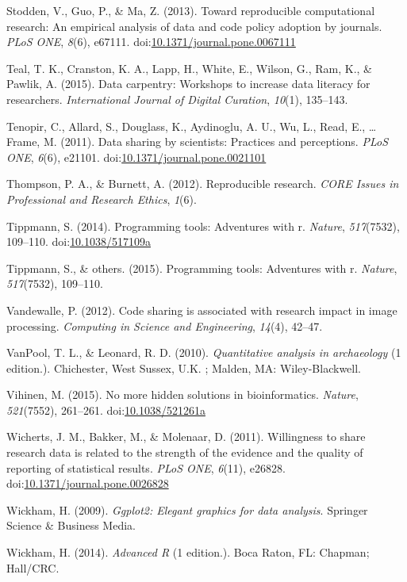 \documentclass[american,man]{apa6}
\begin{document}
Stodden, V., Guo, P., \& Ma, Z. (2013). Toward reproducible
computational research: An empirical analysis of data and code policy
adoption by journals. \emph{PLoS ONE}, \emph{8}(6), e67111.
doi:\href{http://dx.doi.org/10.1371/journal.pone.0067111}{10.1371/journal.pone.0067111}

Teal, T. K., Cranston, K. A., Lapp, H., White, E., Wilson, G., Ram, K.,
\& Pawlik, A. (2015). Data carpentry: Workshops to increase data
literacy for researchers. \emph{International Journal of Digital
Curation}, \emph{10}(1), 135--143.

Tenopir, C., Allard, S., Douglass, K., Aydinoglu, A. U., Wu, L., Read,
E., \ldots{} Frame, M. (2011). Data sharing by scientists: Practices and
perceptions. \emph{PLoS ONE}, \emph{6}(6), e21101.
doi:\href{http://dx.doi.org/10.1371/journal.pone.0021101}{10.1371/journal.pone.0021101}

Thompson, P. A., \& Burnett, A. (2012). Reproducible research.
\emph{CORE Issues in Professional and Research Ethics}, \emph{1}(6).

Tippmann, S. (2014). Programming tools: Adventures with r.
\emph{Nature}, \emph{517}(7532), 109--110.
doi:\href{http://dx.doi.org/10.1038/517109a}{10.1038/517109a}

Tippmann, S., \& others. (2015). Programming tools: Adventures with r.
\emph{Nature}, \emph{517}(7532), 109--110.

Vandewalle, P. (2012). Code sharing is associated with research impact
in image processing. \emph{Computing in Science and Engineering},
\emph{14}(4), 42--47.

{VanPool}, T. L., \& Leonard, R. D. (2010). \emph{Quantitative analysis
in archaeology} (1 edition.). Chichester, West Sussex, U.K. ; Malden,
MA: Wiley-Blackwell.

Vihinen, M. (2015). No more hidden solutions in bioinformatics.
\emph{Nature}, \emph{521}(7552), 261--261.
doi:\href{http://dx.doi.org/10.1038/521261a}{10.1038/521261a}

Wicherts, J. M., Bakker, M., \& Molenaar, D. (2011). Willingness to
share research data is related to the strength of the evidence and the
quality of reporting of statistical results. \emph{PLoS ONE},
\emph{6}(11), e26828.
doi:\href{http://dx.doi.org/10.1371/journal.pone.0026828}{10.1371/journal.pone.0026828}

Wickham, H. (2009). \emph{Ggplot2: Elegant graphics for data analysis}.
Springer Science \& Business Media.

Wickham, H. (2014). \emph{Advanced R} (1 edition.). Boca Raton, FL:
Chapman; Hall/CRC.
\end{document}
